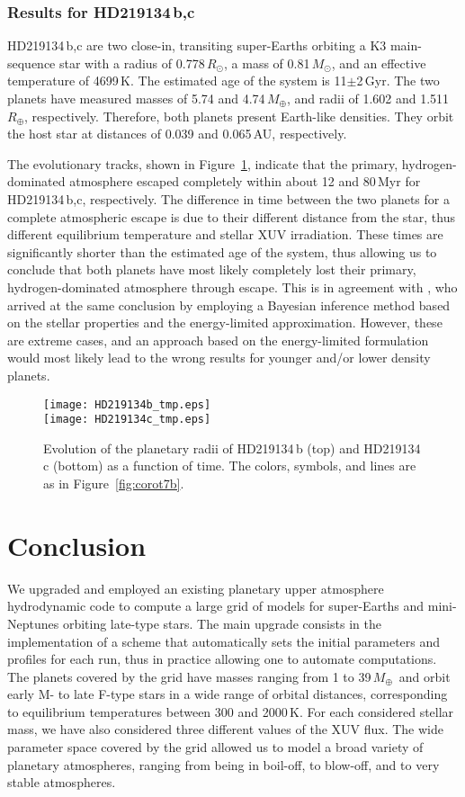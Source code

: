 \documentclass{aa}
\def\Re{\ensuremath{R_{\oplus}}}
\def\Me{\ensuremath{M_{\oplus}}}
\def\Mo{\ensuremath{M_{\odot}}}
\def\Ro{\ensuremath{R_{\odot}}}
\begin{document}
\subsubsection{Results for HD219134\,b,c}
%
HD219134\,b,c are two close-in, transiting super-Earths orbiting a K3 main-sequence star with a radius of 0.778\,\Ro, a mass of 0.81\,\Mo, and an effective temperature of 4699\,K. The estimated age of the system is 11$\pm$2\,Gyr. The two planets have measured masses of 5.74 and 4.74\,\Me, and radii of 1.602 and 1.511\,\Re, respectively. Therefore, both planets present Earth-like densities. They orbit the host star at distances of 0.039 and 0.065\,AU, respectively.

The evolutionary tracks, shown in Figure~\ref{fig:HD219134},
indicate that the primary, hydrogen-dominated atmosphere escaped
completely within about 12 and 80\,Myr for HD219134\,b,c,
respectively. {The difference in time between the two planets for
a complete atmospheric escape is due to their different distance
from the star, thus different equilibrium temperature and stellar
XUV irradiation.} These times are significantly shorter than the
estimated age of the system, thus allowing us to conclude that
both planets have most likely completely lost their primary,
hydrogen-dominated atmosphere through escape. This is in agreement
with \citet{dorn2018}, who arrived at the same conclusion by
employing a Bayesian inference method based on the stellar
properties and the energy-limited approximation. However, these
are extreme cases, and an approach based on the energy-limited
formulation would most likely lead to the wrong results for
younger and/or lower density planets.
\begin{figure}
\texttt{[image: HD219134b\_tmp.eps]}\\
\texttt{[image: HD219134c\_tmp.eps]}
\caption{{Evolution of the planetary radii of HD219134\,b (top)
and HD219134\,c (bottom) as a function of time. The colors,
symbols, and lines are as in Figure~\ref{fig:corot7b}.}}
\label{fig:HD219134}
\end{figure}
%
\section{Conclusion}\label{sec:conclusion}
%
We upgraded and employed an existing planetary upper atmosphere
hydrodynamic code to compute a large grid of models for
{super-Earths and mini-Neptunes} orbiting late-type stars. {The
main upgrade consists in the implementation of a scheme that
automatically sets the initial parameters and profiles for each
run, thus in practice allowing one to automate computations.} The
planets covered by the grid have masses ranging from 1 to 39\,\Me\
and orbit early M- to late F-type stars in a wide range of orbital
distances, corresponding to equilibrium temperatures between 300
and 2000\,K. For each considered stellar mass, we have also
considered three different values of the XUV flux. The wide
parameter space covered by the grid allowed us to model a broad
variety of planetary atmospheres, ranging from being in boil-off,
to blow-off, and to very stable atmospheres.
\end{document}
